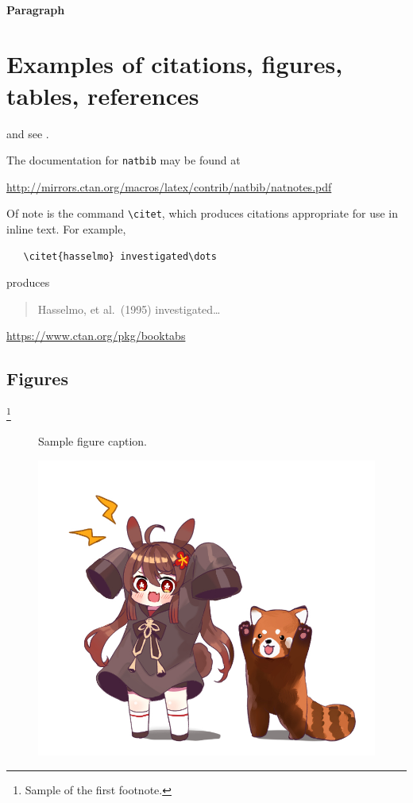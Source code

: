 \documentclass{article}
\begin{document}
\paragraph{Paragraph}
\lipsum[7]

\section{Examples of citations, figures, tables, references}
\label{sec:others}
\lipsum[8] \cite{kour2014real,kour2014fast} and see \cite{hadash2018estimate}.

The documentation for \verb+natbib+ may be found at
\begin{center}
  \url{http://mirrors.ctan.org/macros/latex/contrib/natbib/natnotes.pdf}
\end{center}
Of note is the command \verb+\citet+, which produces citations
appropriate for use in inline text.  For example,
\begin{verbatim}
   \citet{hasselmo} investigated\dots
\end{verbatim}
produces
\begin{quote}
  Hasselmo, et al.\ (1995) investigated\dots
\end{quote}

\begin{center}
  \url{https://www.ctan.org/pkg/booktabs}
\end{center}


\subsection{Figures}
\lipsum[10] 
\footnote{Sample of the first footnote.}
\lipsum[11] 

\begin{figure}
  \centering
  \fbox{\rule[-.5cm]{4cm}{4cm} \rule[-.5cm]{4cm}{0cm}}
  \caption{Sample figure caption.}
  \label{fig:fig1}
\end{figure}

\begin{figure} %
    \centering
    \includegraphics{test.png}
\end{figure}
\end{document}
